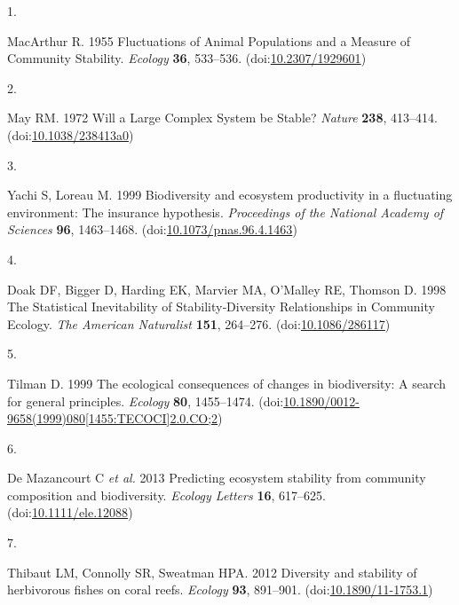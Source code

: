 \documentclass[
]{article}
\newlength{\cslhangindent}
\newlength{\csllabelwidth}
\newlength{\cslentryspacingunit} %
\newenvironment{CSLReferences}[2] %
 {%
  \setlength{\parindent}{0pt}
  \ifodd #1
  \let\oldpar\par
  \def\par{\hangindent=\cslhangindent\oldpar}
  \fi
  \setlength{\parskip}{#2\cslentryspacingunit}
 }%
 {}
\newcommand{\CSLLeftMargin}[1]{\parbox[t]{\csllabelwidth}{#1}}
\newcommand{\CSLRightInline}[1]{\parbox[t]{\linewidth - \csllabelwidth}{#1}\break}
\begin{document}
\hypertarget{refs}{}
\begin{CSLReferences}{0}{0}
\leavevmode{}%
\CSLLeftMargin{1. }%
\CSLRightInline{MacArthur R. 1955 Fluctuations of {Animal} {Populations} and a {Measure} of {Community} {Stability}. \emph{Ecology} \textbf{36}, 533--536. (doi:\href{https://doi.org/10.2307/1929601}{10.2307/1929601})}

\leavevmode{}%
\CSLLeftMargin{2. }%
\CSLRightInline{May RM. 1972 Will a {Large} {Complex} {System} be {Stable}? \emph{Nature} \textbf{238}, 413--414. (doi:\href{https://doi.org/10.1038/238413a0}{10.1038/238413a0})}

\leavevmode{}%
\CSLLeftMargin{3. }%
\CSLRightInline{Yachi S, Loreau M. 1999 Biodiversity and ecosystem productivity in a fluctuating environment: {The} insurance hypothesis. \emph{Proceedings of the National Academy of Sciences} \textbf{96}, 1463--1468. (doi:\href{https://doi.org/10.1073/pnas.96.4.1463}{10.1073/pnas.96.4.1463})}

\leavevmode{}%
\CSLLeftMargin{4. }%
\CSLRightInline{Doak DF, Bigger D, Harding EK, Marvier MA, O'Malley RE, Thomson D. 1998 The {Statistical} {Inevitability} of {Stability}‐{Diversity} {Relationships} in {Community} {Ecology}. \emph{The American Naturalist} \textbf{151}, 264--276. (doi:\href{https://doi.org/10.1086/286117}{10.1086/286117})}

\leavevmode{}%
\CSLLeftMargin{5. }%
\CSLRightInline{Tilman D. 1999 The ecological consequences of changes in biodiversity: A search for general principles. \emph{Ecology} \textbf{80}, 1455--1474. (doi:\href{https://doi.org/10.1890/0012-9658(1999)080\%5B1455:TECOCI\%5D2.0.CO;2}{10.1890/0012-9658(1999)080{[}1455:TECOCI{]}2.0.CO;2})}

\leavevmode{}%
\CSLLeftMargin{6. }%
\CSLRightInline{De Mazancourt C \emph{et al.} 2013 Predicting ecosystem stability from community composition and biodiversity. \emph{Ecology Letters} \textbf{16}, 617--625. (doi:\href{https://doi.org/10.1111/ele.12088}{10.1111/ele.12088})}

\leavevmode{}%
\CSLLeftMargin{7. }%
\CSLRightInline{Thibaut LM, Connolly SR, Sweatman HPA. 2012 Diversity and stability of herbivorous fishes on coral reefs. \emph{Ecology} \textbf{93}, 891--901. (doi:\href{https://doi.org/10.1890/11-1753.1}{10.1890/11-1753.1})}


\end{CSLReferences}
\end{document}
